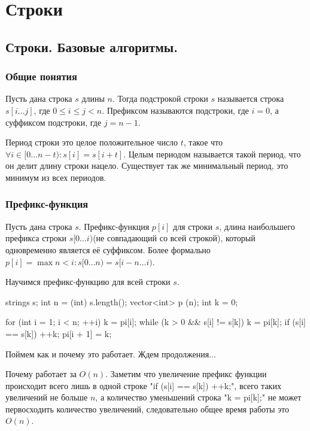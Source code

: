 \chapter{Строки}
\section{Строки. Базовые алгоритмы.}

\subsection{Общие понятия}

Пусть дана строка $s$ длины $n$. 
Тогда подстрокой строки $s$ называется строка $s[i \dots j]$, где $0 \le i \le j < n$.
Префиксом называются подстроки, где $i = 0$, а суффиксом подстроки, где $j = n - 1$.

Период строки это целое положительное число $t$, такое что $\forall i \in [0 \dots n-t) \colon s[i] = s[i + t]$.
Целым периодом называется такой период, что он делит длину строки нацело. 
Существует так же минимальный период, это минимум из всех периодов.

\subsection{Префикс-функция}
Пусть дана строка $s$. 
Префикс-функция $p[i]$ для строки $s$, длина наибольшего префикса строки $s[0 \dots i)$(не совпадающий со всей строкой), который одновременно является её суффиксом.
Более формально $p[i] = \max n < i \colon s[0 \dots n) = s[i - n \dots i)$.

Научимся префикс-функцию для всей строки $s$.

\begin{cppcode}
strings s;
int n = (int) s.length();
vector<int> p (n);
int k = 0;

for (int i = 1; i < n; ++i) {
  k = pi[i];
  while (k > 0 && s[i] != s[k])
    k = pi[k];
  if (s[i] == s[k]) ++k;
  pi[i + 1] = k;
}
\end{cppcode}

Поймем как и почему это работает. 
Ждем продолжения...

Почему работает за $O(n)$.
Заметим что увеличение префикс функции происходит всего лишь в одной строке \cpp"if (s[i] == s[k]) ++k;", всего таких увеличений не больше $n$, а количество уменьшений строка \cpp"k = pi[k];" не может первосходить количество увеличений, следовательно общее время работы это $O(n)$.

